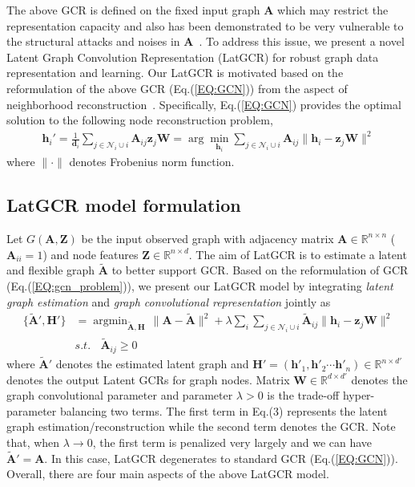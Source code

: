 \documentclass{article}
\begin{document}
The above GCR is defined on the fixed input graph $\textbf{A}$ which may restrict the representation capacity and also has been demonstrated to be
very vulnerable to the structural attacks and noises in $\textbf{A}$~\cite{mettack,prognn,jin2020adversarial}.
To address this issue,   we present a novel Latent Graph Convolution Representation (LatGCR) for robust graph data
representation and learning.
Our LatGCR is motivated based on the reformulation of the above GCR (Eq.(\ref{EQ:GCN}))  from the aspect of neighborhood reconstruction~\cite{NEURIPS2020_99e314b1,PaGCN}.
 Specifically, Eq.(\ref{EQ:GCN}) provides the optimal solution to
the following node reconstruction problem,
\begin{equation}\label{EQ:gcn_problem}
\begin{split}
\mathbf{h}_{i}' = \frac{1}{\mathbf{d}_i}\sum_{j \in \mathcal{N}_i\cup i}  \mathbf{A}_{ij} \mathbf{z}_j\mathbf{W}
=\arg\min_{\mathbf{h}_i} \sum_{j\in \mathcal{N}_i\cup i} \mathbf{{A}}_{ij}\| \mathbf{h}_i - \mathbf{z}_j\textbf{W}\|^2
\end{split}
\end{equation}
where $\|\cdot\|$ denotes Frobenius norm function. 

\subsection{LatGCR model formulation}

Let $G(\mathbf{A}, \mathbf{Z})$ be the input observed graph with adjacency matrix $\mathbf{A}\in \mathbb{R}^{n\times n}$ ($\textbf{A}_{ii}=1$) and node features $\mathbf{Z}\in \mathbb{R}^{n\times d}$.
The aim of LatGCR is to estimate a latent and flexible graph $\widetilde{\mathbf{A}}$ to better support GCR.
Based on the reformulation of GCR (Eq.(\ref{EQ:gcn_problem})), we present our LatGCR model by integrating
\emph{latent graph estimation} and \emph{graph convolutional representation} jointly as
\begin{align}\label{EQ:goc_problem}
\{{\widetilde{\mathbf{A}}}',\mathbf{H}'\}
& = \mathop{\arg\min}_{\widetilde{\mathbf{A}},\mathbf{H}} \,
\big\|\mathbf{A}-\widetilde{\mathbf{A}}\big\|^2 + \lambda
\sum_i \sum_{j\in \mathcal{N}_i\cup i} \widetilde{\mathbf{A}}_{ij}\big\| \mathbf{h}_i - \mathbf{z}_j\mathbf{W}\big\|^2 \\
&  s.t. \ \ \ \ \widetilde{\mathbf{A}}_{ij} \geq 0 \nonumber
\end{align}
where $\widetilde{\mathbf{A}}'$ denotes the estimated latent graph and $\mathbf{H}'=(\mathbf{h}'_1, \mathbf{h}'_2\cdots \mathbf{h}'_n)\in \mathbb{R}^{n\times d'}$ denotes the output Latent GCRs for graph nodes.
 Matrix $\textbf{W}\in \mathbb{R}^{d\times d'}$ denotes the graph convolutional parameter and parameter $\lambda>0$ is the trade-off hyper-parameter  balancing two terms.
 The first term in Eq.(3) represents the latent graph estimation/reconstruction while the second term denotes the GCR.
Note that, when $\lambda \rightarrow 0$, the first term is penalized very largely and we can have $\widetilde{\mathbf{A}}'=\textbf{A}$. In this case,  LatGCR degenerates to standard GCR (Eq.(\ref{EQ:GCN})).
Overall, there are four main aspects of the above LatGCR model.
\end{document}
